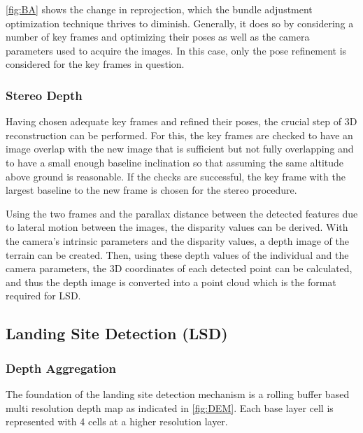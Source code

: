 \cref{fig:BA} shows the change in reprojection, which the bundle adjustment optimization technique thrives to diminish. Generally, it does so by considering a number of key frames and optimizing their poses as well as the camera parameters used to acquire the images. In this case, only the pose refinement is considered for the key frames in question.

\subsubsection{Stereo Depth}

Having chosen adequate key frames and refined their poses, the crucial step of 3D reconstruction can be performed. For this, the key frames are checked to have an image overlap with the new image that is sufficient but not fully overlapping and to have a small enough baseline inclination so that assuming the same altitude above ground is reasonable. If the checks are successful, the key frame with the largest baseline to the new frame is chosen for the stereo procedure. 

Using the two frames and the parallax distance between the detected features due to lateral motion between the images, the disparity values can be derived. With the camera's intrinsic parameters and the disparity values, a depth image of the terrain can be created. Then, using these depth values of the individual and the camera parameters, the 3D coordinates of each detected point can be calculated, and thus the depth image is converted into a point cloud which is the format required for LSD.



\subsection{Landing Site Detection (LSD)}\label{subsec:setup:LSD}

\subsubsection{Depth Aggregation}\label{subsubsec:setup:aggregation}

The foundation of the landing site detection mechanism is a rolling buffer based multi resolution depth map as indicated in \cref{fig:DEM}. Each base layer cell is represented with 4 cells at a higher resolution layer.

